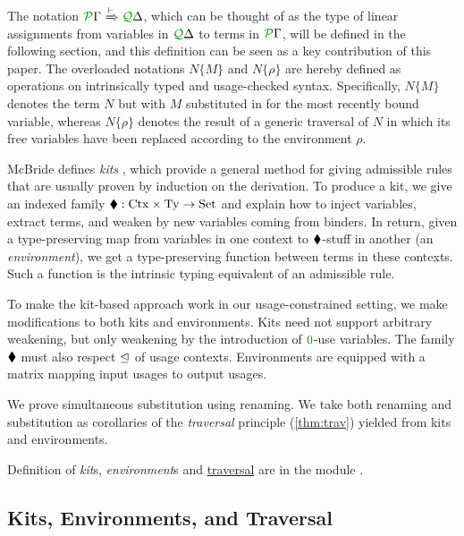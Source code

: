 \documentclass[submission,copyright,creativecommons]{eptcs}
\begin{document}
The notation $\ctx\Gamma P \subst\vdash \ctx\Delta Q$, which can be thought of
as the type of linear assignments from variables in $\ctx\Delta Q$ to terms in
$\ctx\Gamma P$, will be defined in the following section, and this definition
can be seen as a key contribution of this paper.
The overloaded notations $N\{M\}$ and $N\{\rho\}$ are hereby defined as
operations on intrinsically typed and usage-checked syntax.
Specifically, $N\{M\}$ denotes the term $N$ but with $M$ substituted in for the
most recently bound variable, whereas $N\{\rho\}$ denotes the result of a
generic traversal of $N$ in which its free variables have been replaced
according to the environment $\rho$.

McBride defines \emph{kits} \cite{rensub05,bhkm12}, which provide a general
method for giving admissible rules that are usually proven by induction on the
derivation.
To produce a kit, we give an indexed family
$\mathbin{\blacklozenge} : \mathrm{Ctx} \times \mathrm{Ty} \to \mathrm{Set}$ and explain how to
inject variables, extract terms, and weaken by new variables coming from
binders.
In return, given a type-preserving map from variables in one context to
$\mathbin{\blacklozenge}$-stuff in another (an \emph{environment}), we get a type-preserving
function between terms in these contexts.
Such a function is the intrinsic typing equivalent of an admissible rule.

To make the kit-based approach work in our usage-constrained setting, we make
modifications to both kits and environments.
Kits need not support arbitrary weakening, but only weakening by the
introduction of $\rescomment 0$-use variables.
The family $\mathbin{\blacklozenge}$ must also respect $\trianglelefteq$ of usage contexts.
Environments are equipped with a matrix mapping input usages to output usages.

We prove simultaneous substitution using renaming.
We take both renaming and substitution as corollaries of the \emph{traversal}
principle (\autoref{thm:trav}) yielded from kits and environments.

Definition of \emph{kit}s, \emph{environment}s and
\hyperref[thm:trav]{traversal} are in the module
.


\subsection{Kits, Environments, and Traversal}
\end{document}
